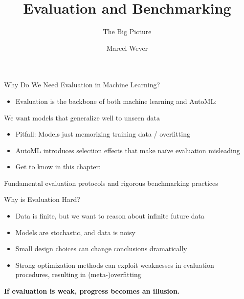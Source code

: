 \documentclass[main]{subfiles}
\title[Evaluation and Benchmarking]{Evaluation and Benchmarking}
\subtitle{The Big Picture}
\author[Marcel Wever]{Marcel Wever}
\date{}
\begin{document}
	
	\maketitle
	

\begin{frame}[c]{Why Do We Need Evaluation in Machine Learning?}

\begin{itemize}
    \item Evaluation is the backbone of both machine learning and AutoML:
\end{itemize}
\begin{center}
We want models that generalize well to unseen data
\end{center}
\begin{itemize}
    \item Pitfall: Models just memorizing training data / overfitting
    \item AutoML introduces selection effects that make na\"ive evaluation misleading
    \item Get to know in this chapter: 
\end{itemize}
\begin{center}
Fundamental evaluation protocols and rigorous benchmarking practices
\end{center}
\end{frame}

\begin{frame}{Why is Evaluation Hard?}
    \begin{itemize}
        \item Data is finite, but we want to reason about infinite future data
        \item Models are stochastic, and data is noisy
        \item Small design choices can change conclusions dramatically
        \item Strong optimization methods can exploit weaknesses in evaluation procedures, resulting in (meta-)overfitting
    \end{itemize}
    \vspace{.5cm}
    \textbf{If evaluation is weak, progress becomes an illusion.}
\end{frame}
\end{document}
